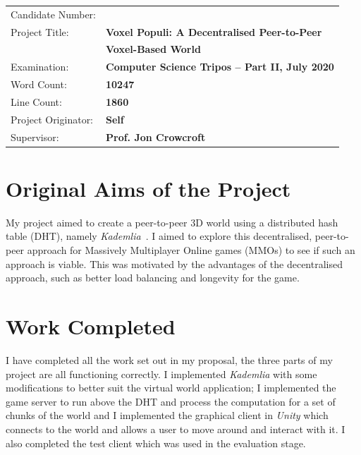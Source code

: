 \documentclass[12pt,notitlepage,a4paper]{report}
\newcommand{\unity}{\emph{Unity}}
\newcommand{\kademlia}{\emph{Kademlia}}
\begin{document}
	{\large
		\begin{tabular}{ll}
			Candidate Number:   & \bf \\
			Project Title:      & \bf Voxel Populi: A Decentralised Peer-to-Peer\\ 
			& \bf Voxel-Based World\\
			Examination:        & \bf Computer Science Tripos -- Part II, July 2020\\
			Word Count:         & \bf 10247\footnotemark[1]\\
			Line Count:         & \bf 1860\footnotemark[2]\\
			Project Originator: & \bf Self\\
			Supervisor:         & \bf Prof. Jon Crowcroft\\
		\end{tabular}
	}
	
	\section*{Original Aims of the Project}
	My project aimed to create a peer-to-peer 3D world using a distributed hash table (DHT), namely \kademlia{}~\cite{kademlia}. I aimed to explore this decentralised, peer-to-peer approach for Massively Multiplayer Online games (MMOs) to see if such an approach is viable. This was motivated by the advantages of the decentralised approach, such as better load balancing and longevity for the game.
	
	\section*{Work Completed}
	I have completed all the work set out in my proposal, the three parts of my project are all functioning correctly. I implemented \kademlia{} with some modifications to better suit the virtual world application; I implemented the game server to run above the DHT and process the computation for a set of chunks of the world and I implemented the graphical client in \unity{} which connects to the world and allows a user to move around and interact with it. I also completed the test client which was used in the evaluation stage.
	
\end{document}
